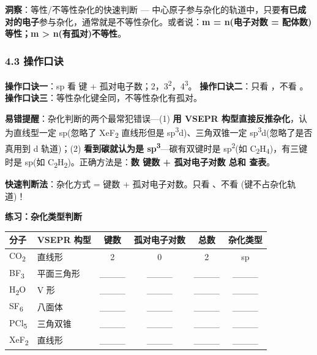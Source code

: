 \textbf{洞察}：等性/不等性杂化的快速判断 --- 中心原子参与杂化的轨道中，只要\textbf{有已成对的电子}参与杂化，通常就是不等性杂化。或者说：\textbf{m = n(电子对数 = 配体数)\箭 等性；m \textgreater{} n(有孤对)\箭 不等性}。

\subsubsection{4.3 操作口诀}\label{ux64cdux4f5cux53e3ux8bc0}

\textbf{操作口诀一}：sp 看  键 + 孤对电子数；2，3\textsuperscript{2}，4\textsuperscript{3}。
\textbf{操作口诀二}：只看 ，不看 \派。
\textbf{操作口诀三}：等性杂化键全同，不等性杂化有孤对。

\textbf{易错提醒}：杂化判断的两个最常犯错误---(1) \textbf{用 VSEPR 构型直接反推杂化}，认为直线型一定 sp(忽略了 XeF\textsubscript{2} 直线形但是 sp\textsuperscript{3}d)、三角双锥一定 sp\textsuperscript{3}d(忽略了是否真用到 d 轨道)；(2) \textbf{看到碳就认为是 sp\textsuperscript{3}}---碳有双键时是 sp\textsuperscript{2}(如 C\textsubscript{2}H\textsubscript{4})，有三键时是 sp(如 C\textsubscript{2}H\textsubscript{2})。正确方法是：\textbf{数  键数 + 孤对电子对数 \箭 总和 \箭 查表}。

\textbf{快速判断法}：杂化方式 =  键数 + 孤对电子对数。只看 、不看 \派(\派 键不占杂化轨道)！

\textbf{练习：杂化类型判断}

{\def\LTcaptype{none} %
\begin{longtable}[]{@{}llcccc@{}}
\toprule\noalign{}
分子 & VSEPR 构型 &  键数 & 孤对电子对数 & 总数 & 杂化类型 \\
\midrule\noalign{}
\endhead
\bottomrule\noalign{}
\endlastfoot
CO\textsubscript{2} & 直线形 & 2 & 0 & 2 & sp \\
BF\textsubscript{3} & 平面三角形 & \_\_\_\_ & \_\_\_\_ & \_\_\_\_ & \_\_\_\_ \\
H\textsubscript{2}O & V 形 & \_\_\_\_ & \_\_\_\_ & \_\_\_\_ & \_\_\_\_ \\
SF\textsubscript{6} & 八面体 & \_\_\_\_ & \_\_\_\_ & \_\_\_\_ & \_\_\_\_ \\
PCl\textsubscript{5} & 三角双锥 & \_\_\_\_ & \_\_\_\_ & \_\_\_\_ & \_\_\_\_ \\
XeF\textsubscript{2} & 直线形 & \_\_\_\_ & \_\_\_\_ & \_\_\_\_ & \_\_\_\_ \\
\end{longtable}
}

